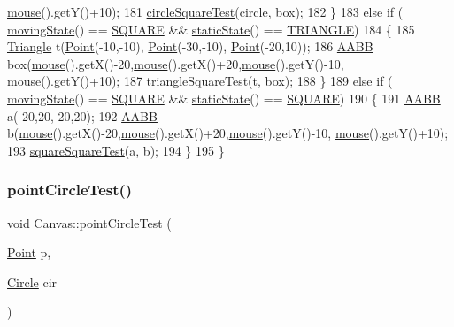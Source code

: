 \begin{DoxyCode}
      \hyperlink{class_canvas_a5c78c7a84c0f9d5540caeab66b677299}{mouse}().getY()+10);
181         \hyperlink{class_canvas_ad9d725683b22b2dc7a5974fed63c16bb}{circleSquareTest}(circle, box);
182     \}
183     \textcolor{keywordflow}{else} \textcolor{keywordflow}{if} ( \hyperlink{class_canvas_a8097ff7e44fb5fecf0dd0997e13e4c32}{movingState}() == \hyperlink{class_canvas_a2d0245c75d7fc30adb8abd303844c10f}{SQUARE} && \hyperlink{class_canvas_a63f657b762d08168f52630bc49efbf71}{staticState}() == 
      \hyperlink{class_canvas_a7d54031701bd0ddbe165a6d4350ab9d6}{TRIANGLE})
184     \{
185         \hyperlink{class_triangle}{Triangle} t(\hyperlink{class_point}{Point}(-10,-10), \hyperlink{class_point}{Point}(-30,-10), \hyperlink{class_point}{Point}(-20,10));
186         \hyperlink{class_a_a_b_b}{AABB} box(\hyperlink{class_canvas_a5c78c7a84c0f9d5540caeab66b677299}{mouse}().getX()-20,\hyperlink{class_canvas_a5c78c7a84c0f9d5540caeab66b677299}{mouse}().getX()+20,\hyperlink{class_canvas_a5c78c7a84c0f9d5540caeab66b677299}{mouse}().getY()-10,
      \hyperlink{class_canvas_a5c78c7a84c0f9d5540caeab66b677299}{mouse}().getY()+10);
187         \hyperlink{class_canvas_a8b0b8a040b3e5628a2ec2a89a3025eae}{triangleSquareTest}(t, box);
188     \}
189     \textcolor{keywordflow}{else} \textcolor{keywordflow}{if} ( \hyperlink{class_canvas_a8097ff7e44fb5fecf0dd0997e13e4c32}{movingState}() == \hyperlink{class_canvas_a2d0245c75d7fc30adb8abd303844c10f}{SQUARE} && \hyperlink{class_canvas_a63f657b762d08168f52630bc49efbf71}{staticState}() == 
      \hyperlink{class_canvas_a2d0245c75d7fc30adb8abd303844c10f}{SQUARE})
190     \{
191         \hyperlink{class_a_a_b_b}{AABB} a(-20,20,-20,20);
192         \hyperlink{class_a_a_b_b}{AABB} b(\hyperlink{class_canvas_a5c78c7a84c0f9d5540caeab66b677299}{mouse}().getX()-20,\hyperlink{class_canvas_a5c78c7a84c0f9d5540caeab66b677299}{mouse}().getX()+20,\hyperlink{class_canvas_a5c78c7a84c0f9d5540caeab66b677299}{mouse}().getY()-10,
      \hyperlink{class_canvas_a5c78c7a84c0f9d5540caeab66b677299}{mouse}().getY()+10);
193         \hyperlink{class_canvas_a56718ad140b37cabc6b34157903886ee}{squareSquareTest}(a, b);
194     \}
195 \}
\end{DoxyCode}
\mbox{\label{class_canvas_a407d5fea40a48519ab368d39739943c4}} 
\subsubsection{\texorpdfstring{point\+Circle\+Test()}{pointCircleTest()}}
{\footnotesize\ttfamily void Canvas\+::point\+Circle\+Test (\begin{DoxyParamCaption}\item[{\hyperlink{class_point}{Point}}]{p,  }\item[{\hyperlink{class_circle}{Circle}}]{cir }\end{DoxyParamCaption})\hspace{0.3cm}{\ttfamily [private]}}



